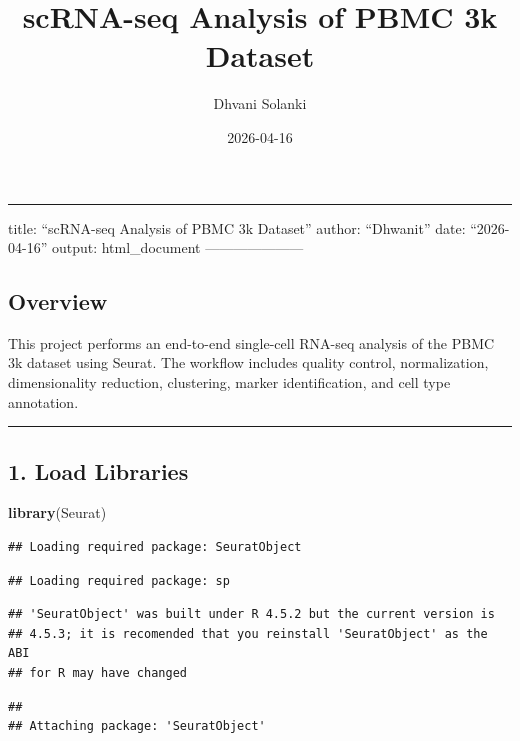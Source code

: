 \documentclass[
]{article}
\title{scRNA-seq Analysis of PBMC 3k Dataset}
\author{Dhvani Solanki}
\date{2026-04-16}
\newenvironment{Shaded}{\begin{snugshade}}{\end{snugshade}}
\newcommand{\FunctionTok}[1]{\textcolor[rgb]{0.13,0.29,0.53}{\textbf{#1}}}
\newcommand{\NormalTok}[1]{#1}
\begin{document}
\maketitle

\begin{center}\rule{0.5\linewidth}{0.5pt}\end{center}

title: ``scRNA-seq Analysis of PBMC 3k Dataset'' author: ``Dhwanit''
date: ``2026-04-16'' output: html\_document ---------------------

\subsection{Overview}\label{overview}

This project performs an end-to-end single-cell RNA-seq analysis of the
PBMC 3k dataset using Seurat. The workflow includes quality control,
normalization, dimensionality reduction, clustering, marker
identification, and cell type annotation.

\begin{center}\rule{0.5\linewidth}{0.5pt}\end{center}

\subsection{1. Load Libraries}\label{load-libraries}

\begin{Shaded}
\begin{Highlighting}[]
\FunctionTok{library}\NormalTok{(Seurat)}
\end{Highlighting}
\end{Shaded}

\begin{verbatim}
## Loading required package: SeuratObject
\end{verbatim}

\begin{verbatim}
## Loading required package: sp
\end{verbatim}

\begin{verbatim}
## 'SeuratObject' was built under R 4.5.2 but the current version is
## 4.5.3; it is recomended that you reinstall 'SeuratObject' as the ABI
## for R may have changed
\end{verbatim}

\begin{verbatim}
## 
## Attaching package: 'SeuratObject'
\end{verbatim}
\end{document}
